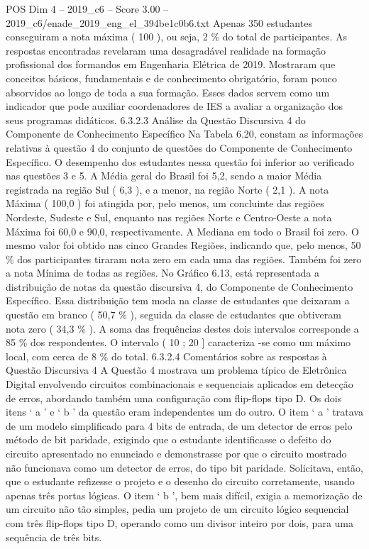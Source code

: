 \begin{textsample}{POS Dim 4 – 2019\_c6 – Score 3.00 – 2019\_c6/enade\_2019\_eng\_el\_394be1c0b6.txt}
Apenas 350 estudantes conseguiram a nota máxima ( 100 ), ou seja, 2 \% do total de participantes.
As respostas encontradas revelaram uma desagradável realidade na formação profissional dos formandos em Engenharia Elétrica de 2019.
Mostraram que conceitos básicos, fundamentais e de conhecimento obrigatório, foram pouco absorvidos ao longo de toda a sua formação.
Esses dados servem como um indicador que pode auxiliar coordenadores de IES a avaliar a organização dos seus programas didáticos. 6.3.2.3 Análise da Questão Discursiva 4 do Componente de Conhecimento Específico Na Tabela 6.20, constam as informações relativas à questão 4 do conjunto de questões do Componente de Conhecimento Específico.
O desempenho dos estudantes nessa questão foi inferior ao verificado nas questões 3 e 5.
A Média geral do Brasil foi 5,2, sendo a maior Média registrada na região Sul ( 6,3 ), e a menor, na região Norte ( 2,1 ).
A nota Máxima ( 100,0 ) foi atingida por, pelo menos, um concluinte das regiões Nordeste, Sudeste e Sul, enquanto nas regiões Norte e Centro-Oeste a nota Máxima foi 60,0 e 90,0, respectivamente.
A Mediana em todo o Brasil foi zero.
O mesmo valor foi obtido nas cinco Grandes Regiões, indicando que, pelo menos, 50 \% dos participantes tiraram nota zero em cada uma das regiões.
Também foi zero a nota Mínima de todas as regiões.
No Gráfico 6.13, está representada a distribuição de notas da questão discursiva 4, do Componente de Conhecimento Específico.
Essa distribuição tem moda na classe de estudantes que deixaram a questão em branco ( 50,7 \% ), seguida da classe de estudantes que obtiveram nota zero ( 34,3 \% ).
A soma das frequências destes dois intervalos corresponde a 85 \% dos respondentes.
O intervalo ( 10 ; 20 ] caracteriza -se como um máximo local, com cerca de 8 \% do total. 6.3.2.4 Comentários sobre as respostas à Questão Discursiva 4 A Questão 4 mostrava um problema típico de Eletrônica Digital envolvendo circuitos combinacionais e sequenciais aplicados em detecção de erros, abordando também uma configuração com flip-flops tipo D.
Os dois itens ‘ a ’ e ‘ b ’ da questão eram independentes um do outro.
O item ‘ a ’ tratava de um modelo simplificado para 4 bits de entrada, de um detector de erros pelo método de bit paridade, exigindo que o estudante identificasse o defeito do circuito apresentado no enunciado e demonstrasse por que o circuito mostrado não funcionava como um detector de erros, do tipo bit paridade.
Solicitava, então, que o estudante refizesse o projeto e o desenho do circuito corretamente, usando apenas três portas lógicas.
O item ‘ b ’, bem mais difícil, exigia a memorização de um circuito não tão simples, pedia um projeto de um circuito lógico sequencial com três flip-flops tipo D, operando como um divisor inteiro por dois, para uma sequência de três bits.

\end{textsample}
